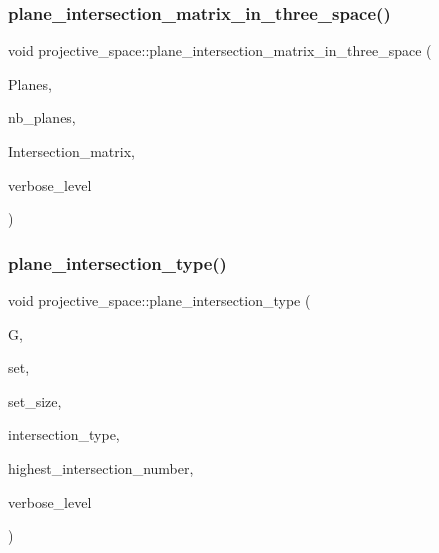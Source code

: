 \subsubsection{\texorpdfstring{plane\+\_\+intersection\+\_\+matrix\+\_\+in\+\_\+three\+\_\+space()}{plane\_intersection\_matrix\_in\_three\_space()}}
{\footnotesize\ttfamily void projective\+\_\+space\+::plane\+\_\+intersection\+\_\+matrix\+\_\+in\+\_\+three\+\_\+space (\begin{DoxyParamCaption}\item[{\mbox{\hyperlink{galois_8h_a09fddde158a3a20bd2dcadb609de11dc}{I\+NT}} $\ast$}]{Planes,  }\item[{\mbox{\hyperlink{galois_8h_a09fddde158a3a20bd2dcadb609de11dc}{I\+NT}}}]{nb\+\_\+planes,  }\item[{\mbox{\hyperlink{galois_8h_a09fddde158a3a20bd2dcadb609de11dc}{I\+NT}} $\ast$\&}]{Intersection\+\_\+matrix,  }\item[{\mbox{\hyperlink{galois_8h_a09fddde158a3a20bd2dcadb609de11dc}{I\+NT}}}]{verbose\+\_\+level }\end{DoxyParamCaption})}

\mbox{\label{classprojective__space_a56e1a6fec768ec2e052bf609872e229b}} 
\subsubsection{\texorpdfstring{plane\+\_\+intersection\+\_\+type()}{plane\_intersection\_type()}}
{\footnotesize\ttfamily void projective\+\_\+space\+::plane\+\_\+intersection\+\_\+type (\begin{DoxyParamCaption}\item[{\mbox{\hyperlink{classgrassmann}{grassmann}} $\ast$}]{G,  }\item[{\mbox{\hyperlink{galois_8h_a09fddde158a3a20bd2dcadb609de11dc}{I\+NT}} $\ast$}]{set,  }\item[{\mbox{\hyperlink{galois_8h_a09fddde158a3a20bd2dcadb609de11dc}{I\+NT}}}]{set\+\_\+size,  }\item[{\mbox{\hyperlink{galois_8h_a09fddde158a3a20bd2dcadb609de11dc}{I\+NT}} $\ast$\&}]{intersection\+\_\+type,  }\item[{\mbox{\hyperlink{galois_8h_a09fddde158a3a20bd2dcadb609de11dc}{I\+NT}} \&}]{highest\+\_\+intersection\+\_\+number,  }\item[{\mbox{\hyperlink{galois_8h_a09fddde158a3a20bd2dcadb609de11dc}{I\+NT}}}]{verbose\+\_\+level }\end{DoxyParamCaption})}

